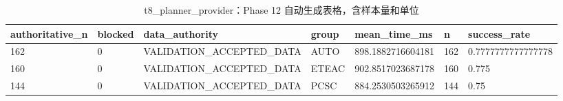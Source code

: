 \begin{table}[htbp]
\centering
\caption{t8_planner_provider：Phase 12 自动生成表格，含样本量和单位}
\begin{tabular}{lllllll}
\hline
authoritative_n & blocked & data_authority & group & mean_time_ms & n & success_rate \\
\hline
162 & 0 & VALIDATION\_ACCEPTED\_DATA & AUTO & 898.1882716604181 & 162 & 0.7777777777777778 \\
160 & 0 & VALIDATION\_ACCEPTED\_DATA & ETEAC & 902.8517023687178 & 160 & 0.775 \\
144 & 0 & VALIDATION\_ACCEPTED\_DATA & PCSC & 884.2530503265912 & 144 & 0.75 \\
\hline
\end{tabular}
\end{table}
